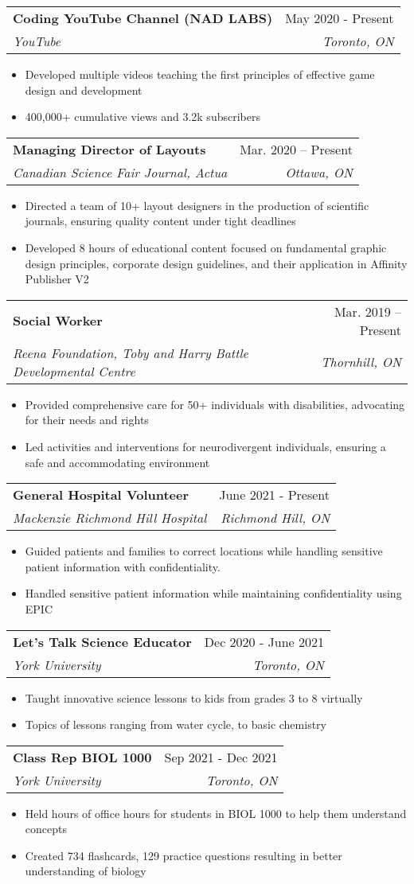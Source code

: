 \documentclass[letterpaper,11pt]{article}
\makeatletter
\newcommand{\resumeItem}[1]{
  \item\small{
    {#1 \vspace{-2pt}}
  }
}
\newcommand{\resumeSubheading}[4]{
  \vspace{-2pt}\item
    \begin{tabular*}{0.97\textwidth}[t]{l@{\extracolsep{\fill}}r}
      \textbf{#1} & #2 \\
      \textit{\small#3} & \textit{\small #4} \\
    \end{tabular*}\vspace{-7pt}
}
\newcommand{\resumeItemListStart}{\begin{itemize}}
\newcommand{\resumeItemListEnd}{\end{itemize}\vspace{-5pt}}
\makeatother
\begin{document}
    
    \resumeSubheading
      {Coding YouTube Channel (NAD LABS)}{May 2020 - Present}     
      {YouTube}{Toronto, ON}
      \resumeItemListStart
        \resumeItem{Developed multiple videos teaching the first principles of effective game design and development}
        \resumeItem{400,000+ cumulative views and 3.2k subscribers}
    \resumeItemListEnd
    
    \resumeSubheading
      {Managing Director of Layouts}{Mar. 2020 -- Present}
      {Canadian Science Fair Journal, Actua}{Ottawa, ON}
       \resumeItemListStart
        \resumeItem{Directed a team of 10+ layout designers in the production of scientific journals, ensuring quality content under tight deadlines}
        \resumeItem{Developed 8 hours of educational content focused on fundamental graphic design principles, corporate design guidelines, and their application in Affinity Publisher V2}

    \resumeItemListEnd


    \resumeSubheading
      {Social Worker}{Mar. 2019 -- Present}
      {Reena Foundation, Toby and Harry Battle Developmental Centre}{Thornhill, ON}
      \resumeItemListStart
        \resumeItem{Provided comprehensive care for 50+ individuals with disabilities, advocating for their needs and rights}
        \resumeItem{Led activities and interventions for neurodivergent individuals, ensuring a safe and accommodating environment}
    \resumeItemListEnd


    \resumeSubheading
      {General Hospital Volunteer}{June 2021 - Present}
      {Mackenzie Richmond Hill Hospital}{Richmond Hill, ON}
      \resumeItemListStart
      \resumeItem{Guided patients and families to correct locations while handling sensitive patient information with confidentiality.}

        \resumeItem{Handled sensitive patient information while maintaining confidentiality using EPIC}
    \resumeItemListEnd





    
    \resumeSubheading
      {Let's Talk Science Educator}{Dec 2020 - June 2021}     
      {York University}{Toronto, ON}
      \resumeItemListStart
        \resumeItem{Taught innovative science lessons to kids from grades 3 to 8 virtually}
        \resumeItem{Topics of lessons ranging from water cycle, to basic chemistry}
    \resumeItemListEnd        
    
    \resumeSubheading
      {Class Rep BIOL 1000}{Sep 2021 - Dec 2021}     
      {York University}{Toronto, ON}
      \resumeItemListStart
        \resumeItem{Held hours of office hours for students in BIOL 1000 to help them understand concepts }
        \resumeItem{Created 734 flashcards, 129 practice questions resulting in better understanding of biology}
    \resumeItemListEnd    
    
\end{document}
